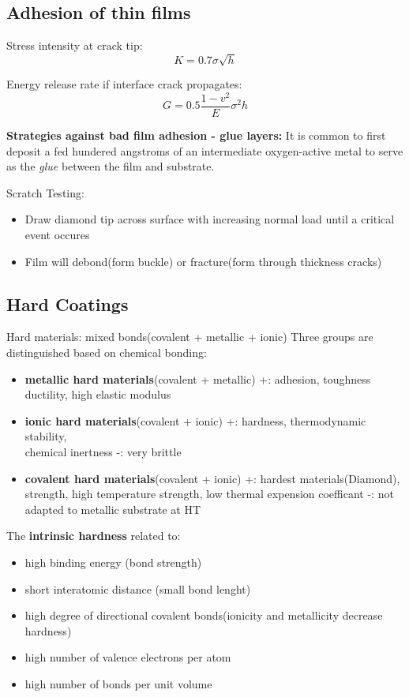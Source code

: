 \subsection{Adhesion of thin films}

Stress intensity at crack tip:
\[
K = 0.7 \sigma\sqrt{h}
\]

Energy release rate if interface crack propagates:
\[
G = 0.5 \frac{1-v^2}{E}\sigma^2 h
\]

\textbf{Strategies against bad film adhesion - glue layers:} It is common to first deposit a fed hundered angstroms of an intermediate oxygen-active metal to serve as the \textit{glue} between the film and substrate.

Scratch Testing:
\begin{itemize}
    \item Draw diamond tip across surface with increasing normal load until a critical event occures
    \item Film will debond(form buckle) or fracture(form through thickness cracks)
\end{itemize}

\subsection{Hard Coatings}
Hard materials: mixed bonds(covalent + metallic + ionic)
Three groups are distinguished based on chemical bonding:
\begin{itemize}
    \item \textbf{metallic hard materials}(covalent + metallic)
    \subitem +: adhesion, toughness ductility, high elastic modulus
    \item \textbf{ionic hard materials}(covalent + ionic)
    \subitem +: hardness, thermodynamic stability, \\chemical inertness
    \subitem -: very brittle
    \item \textbf{covalent hard materials}(covalent + ionic)
    \subitem +: hardest materials(Diamond), strength, high temperature strength, low thermal expension coefficant
    \subitem -: not adapted to metallic substrate at HT
\end{itemize}

The \textbf{intrinsic hardness }related to:
\begin{itemize}
    \item high binding energy (bond strength)
    \item short interatomic distance (small bond lenght)
    \item high degree of directional covalent bonds(ionicity and metallicity decrease hardness)
    \item high number of valence electrons per atom
    \item high number of bonds per unit volume
\end{itemize}